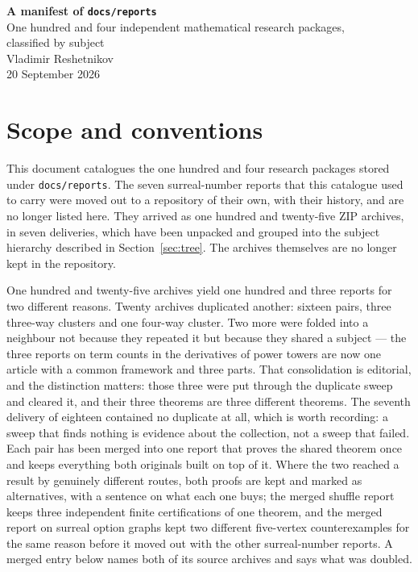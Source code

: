 \documentclass[11pt]{article}
\newcommand{\dir}[1]{\texttt{#1}}
\begin{document}
\begin{center}
  {\LARGE\bfseries\color{Ink} A manifest of \texttt{docs/reports}}\\[0.6em]
  {\large One hundred and four independent mathematical research packages,\\
   classified by subject}\\[1.0em]
  {\normalsize Vladimir Reshetnikov}\\[0.3em]
  {\normalsize 20 September 2026}
\end{center}

\vspace{0.8em}

\section{Scope and conventions}

This document catalogues the one hundred and four research packages stored
under \dir{docs/reports}.  The seven surreal-number reports that this catalogue
used to carry were moved out to a repository of their own, with their history,
and are no longer listed here.  They arrived as one hundred and twenty-five ZIP
archives, in seven deliveries, which have been unpacked and grouped into the
subject hierarchy described in Section~\ref{sec:tree}.  The archives themselves
are no longer kept in the repository.

One hundred and twenty-five archives yield one hundred and three reports for
two different reasons.  Twenty archives duplicated another: sixteen pairs, three
three-way clusters and one four-way cluster.  Two more were folded into a
neighbour not because they repeated it but because they shared a subject --- the
three reports on term counts in the derivatives of power towers are now one
article with a common framework and three parts.  That consolidation is
editorial, and the distinction matters: those three were put through the
duplicate sweep and cleared it, and their three theorems are three different
theorems.  The seventh delivery of eighteen contained no duplicate at all, which
is worth recording: a sweep that finds nothing is evidence about the collection,
not a sweep that failed.
Each pair has been merged into one report that proves the
shared theorem once and keeps everything both originals built on top of it.
Where the two reached a result by genuinely different routes, both proofs are
kept and marked as alternatives, with a sentence on what each one buys; the
merged shuffle report keeps three independent finite certifications of one
theorem, and the merged report on surreal option graphs kept two different
five-vertex counterexamples for the same reason before it moved out with the
other surreal-number reports.  A merged entry below names both of its
source archives and says what was doubled.
\end{document}
